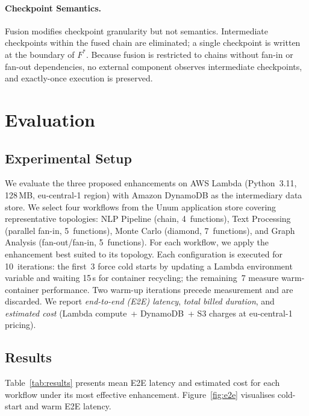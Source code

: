 \documentclass[runningheads]{llncs}
\begin{document}
\paragraph{Checkpoint Semantics.}
Fusion modifies checkpoint granularity but not semantics. Intermediate checkpoints within the fused chain are eliminated; a single checkpoint is written at the boundary of $F^{*}$. Because fusion is restricted to chains without fan-in or fan-out dependencies, no external component observes intermediate checkpoints, and exactly-once execution is preserved.

\section{Evaluation}
\label{sec:evaluation}

\subsection{Experimental Setup}

We evaluate the three proposed enhancements on AWS Lambda (Python~3.11, 128\,MB, eu-central-1 region) with Amazon DynamoDB as the intermediary data store. We select four workflows from the Unum application store covering representative topologies: NLP Pipeline (chain, 4~functions), Text Processing (parallel fan-in, 5~functions), Monte Carlo (diamond, 7~functions), and Graph Analysis (fan-out/fan-in, 5~functions). For each workflow, we apply the enhancement best suited to its topology. Each configuration is executed for 10~iterations: the first~3 force cold starts by updating a Lambda environment variable and waiting 15\,s for container recycling; the remaining~7 measure warm-container performance. Two warm-up iterations precede measurement and are discarded. We report \emph{end-to-end (E2E) latency}, \emph{total billed duration}, and \emph{estimated cost} (Lambda compute~+ DynamoDB~+ S3 charges at eu-central-1 pricing).

\subsection{Results}
\label{sec:results}

Table~\ref{tab:results} presents mean E2E latency and estimated cost for each workflow under its most effective enhancement. Figure~\ref{fig:e2e} visualises cold-start and warm E2E latency.
\end{document}
